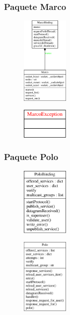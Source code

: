 \documentclass{article}
\begin{document}
\subsubsection{Paquete Marco}

\begin{figure}[H]
\centering
\includegraphics[width=0.2\textwidth]{class_marco_marcobinding}
\end{figure}

\begin{figure}[H]
\centering
\includegraphics[width=0.2\textwidth]{class_marcoexception}
\end{figure}

\subsubsection{Paquete Polo}

\begin{figure}[H]
\centering
\includegraphics[width=0.2\textwidth]{class_polobinding}
\end{figure}

\begin{figure}[H]
\centering
\includegraphics[width=0.2\textwidth]{class_polo}
\end{figure}
\end{document}
